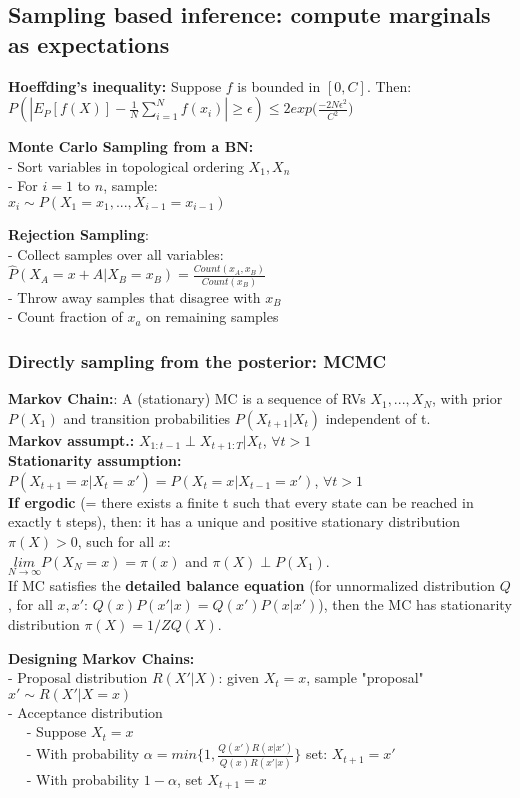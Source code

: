 \subsection{Sampling based inference: compute marginals as expectations}
\textbf{Hoeffding's inequality:} Suppose $f$ is bounded in $[0, C]$. Then:\\
$P(|E_P[f(X)]-\frac{1}{N}\sum_{i=1}^N f(x_i)|\geq\epsilon) \leq 2exp\big( \frac{-2N\epsilon^2}{C^2}\big)$

\textbf{Monte Carlo Sampling from a BN:}\\
- Sort variables in topological ordering $X_1, X_n$\\
- For $i=1$ to $n$, sample:\\
$x_i \sim P(X_1=x_1, ..., X_{i-1}=x_{i-1})$

\textbf{Rejection Sampling}:\\
- Collect samples over all variables:\\
    $\hat{P}(X_A =x+A | X_B=x_B)=\frac{Count(x_A, x_B)}{Count(x_B)}$\\
- Throw away samples that disagree with $x_B$\\
- Count fraction of $x_a$ on remaining samples


\subsubsection{Directly sampling from the posterior: MCMC}
\textbf{Markov Chain:}: A (stationary) MC is a sequence of RVs $X_1, ..., X_N$, with prior $P(X_1)$ and transition probabilities $P(X_{t+1}|X_t)$ independent of t.\\
\textbf{Markov assumpt.:} $X_{1:t-1}\perp X_{t+1:T}|X_t$, $\forall t>1$\\
\textbf{Stationarity assumption:}\\
$P(X_{t+1}=x|X_t=x')=P(X_{t}=x|X_{t-1}=x')$, $\forall t>1$\\
\textbf{If ergodic} (= there exists a finite t such that every state can be reached in exactly t steps), then: it has a unique and positive stationary distribution $\pi(X)>0$, such for all $x$:\\
            $\underset{N\rightarrow\infty}{lim}P(X_N=x)=\pi(x)$ and $\pi(X)\perp P(X_1)$.\\
If MC satisfies the \textbf{detailed balance equation} (for unnormalized distribution $Q$, for all $x,x'$: $Q(x)P(x'|x)=Q(x')P(x|x')$), then the MC has stationarity distribution $\pi(X)=1/ZQ(X)$.

\textbf{Designing Markov Chains:}\\
- Proposal distribution $R(X'|X)$: given $X_t=x$, sample "proposal" $x'\sim R(X'|X=x)$\\
- Acceptance distribution\\
$\quad$ - Suppose $X_t=x$\\
$\quad$ - With probability $\alpha=min \Big\{1, \frac{Q(x')R(x|x')}{Q(x)R(x'|x)}\Big\}$
        set: $X_{t+1}=x'$\\
$\quad$ - With probability $1-\alpha$, set $X_{t+1}=x$\\

